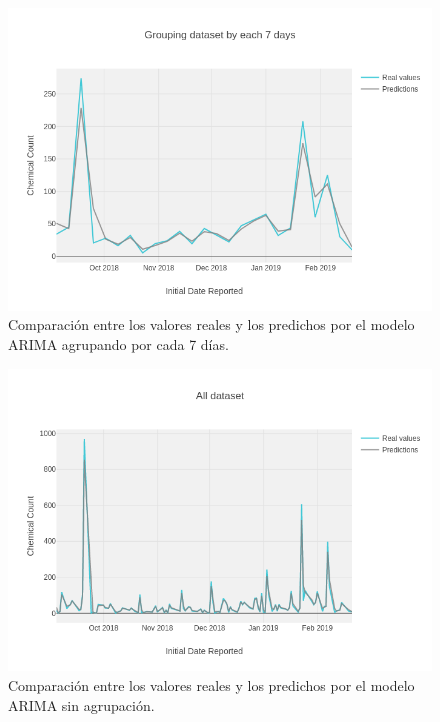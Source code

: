 \newpage
\begin{figure}[!th]
\includegraphics[scale=0.5]{figures/ts-grouping-by-7days}
\centering
\caption{Comparación entre los valores reales y los predichos por el modelo ARIMA agrupando por cada 7 días.}
\label{fig:ts-grouping-by-7days}
\end{figure}

\begin{figure}[!th]
\includegraphics[scale=0.5]{figures/ts-alldataset}
\centering
\caption{Comparación entre los valores reales y los predichos por el modelo ARIMA sin agrupación.}
\label{fig:ts-alldataset}
\end{figure}
